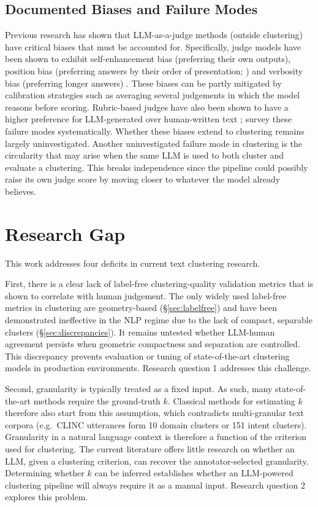 \documentclass[11pt,a4paper,oneside]{report}
\begin{document}
\subsection{Documented Biases and Failure Modes}\label{sec:judgebiases}

Previous research has shown that LLM-as-a-judge methods (outside clustering) have critical biases that must be accounted for. Specifically, judge models have been shown to exhibit self-enhancement bias (preferring their own outputs), position bias (preferring answers by their order of presentation; \citealp{wang2024fair}) and verbosity bias (preferring longer answers) \citep{zheng2023judging}. These biases can be partly mitigated by calibration strategies such as averaging several judgements in which the model reasons before scoring. Rubric-based judges have also been shown to have a higher preference for LLM-generated over human-written text \citep{liu2023geval}; \citet{gu2024judgesurvey} survey these failure modes systematically. Whether these biases extend to clustering remains largely uninvestigated. Another uninvestigated failure mode in clustering is the circularity that may arise when the same LLM is used to both cluster and evaluate a clustering. This breaks independence since the pipeline could possibly raise its own judge score by moving closer to whatever the model already believes.

\section{Research Gap}\label{sec:gap}

This work addresses four deficits in current text clustering research.

First, there is a clear lack of label-free clustering-quality validation metrics that is shown to correlate with human judgement. The only widely used label-free metrics in clustering are geometry-based (\S\ref{sec:labelfree}) and have been demonstrated ineffective in the NLP regime due to the lack of compact, separable clusters (\S\ref{sec:discrepancies}). It remains untested whether LLM-human agreement persists when geometric compactness and separation are controlled. This discrepancy prevents evaluation or tuning of state-of-the-art clustering models in production environments. Research question 1 addresses this challenge.

Second, granularity is typically treated as a fixed input. As such, many state-of-the-art methods require the ground-truth $k$. Classical methods for estimating $k$ therefore also start from this assumption, which contradicts multi-granular text corpora (e.g.\ CLINC utterances form 10 domain clusters or 151 intent clusters). Granularity in a natural language context is therefore a function of the criterion used for clustering. The current literature offers little research on whether an LLM, given a clustering criterion, can recover the annotator-selected granularity. Determining whether $k$ can be inferred establishes whether an LLM-powered clustering pipeline will always require it as a manual input. Research question 2 explores this problem.
\end{document}

